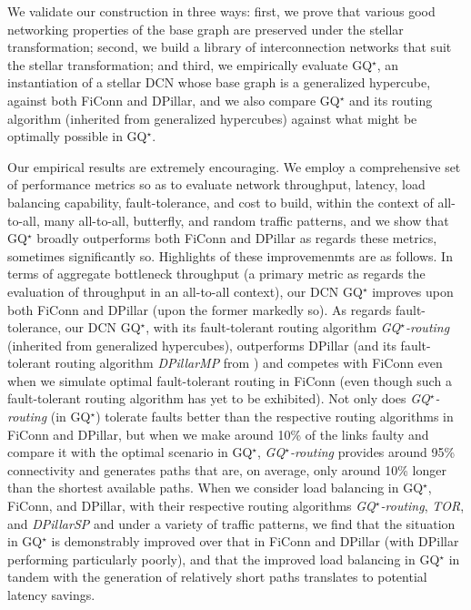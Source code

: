 \documentclass[]{amsart}
\begin{document}
We validate our construction in three ways: first, we prove
that various good networking properties of the base graph are
preserved under the stellar transformation;
second, we build a library of interconnection networks that
suit the stellar transformation; and third, we empirically evaluate
GQ$^\star$, an instantiation of a stellar DCN whose base graph
is a generalized hypercube, against both FiConn and DPillar, and we also compare GQ$^\star$ and its routing algorithm (inherited from generalized hypercubes) against what might be optimally possible in GQ$^\star$.

Our empirical results are extremely encouraging. We employ a comprehensive set of performance metrics so as to evaluate network
throughput, latency, load balancing capability, fault-tolerance, and cost to build, within the context of all-to-all, many all-to-all, butterfly, and random traffic patterns, and we show that GQ$^\star$ broadly outperforms both FiConn and DPillar as regards these metrics, sometimes significantly so. Highlights of these improvemenmts are as follows. In terms of aggregate bottleneck throughput (a primary metric as regards the evaluation of throughput in an all-to-all context), our DCN GQ$^\star$ improves upon both FiConn and DPillar (upon the former markedly so). As regards fault-tolerance, our DCN GQ$^\star$, with its fault-tolerant routing algorithm \emph{GQ$^\star$-routing\/} (inherited from generalized hypercubes), outperforms DPillar (and its fault-tolerant routing algorithm \emph{DPillarMP\/} from \cite{LiaoYinYin2012}) and competes with FiConn even when we simulate optimal fault-tolerant routing in FiConn (even though such a fault-tolerant routing algorithm has yet to be exhibited). Not only does \emph{GQ$^\star$-routing\/} (in GQ$^\star$) tolerate faults better than the respective routing algorithms in FiConn and DPillar, but when we make around 10\% of the links faulty and compare it with the optimal scenario in GQ$^\star$, \emph{GQ$^\star$-routing\/} provides around 95\% connectivity and generates paths that are, on average, only around 10\% longer than the shortest available paths. When we consider load balancing in GQ$^\star$, FiConn, and DPillar, with their respective routing algorithms \emph{GQ$^\star$-routing\/}, \emph{TOR\/}, and \emph{DPillarSP\/}  and under a variety of traffic patterns, we find that the situation in GQ$^\star$ is demonstrably improved over that in FiConn and DPillar (with DPillar performing particularly poorly), and that the improved load balancing in GQ$^\star$ in tandem with the generation of relatively short paths translates to potential latency savings.
\end{document}

